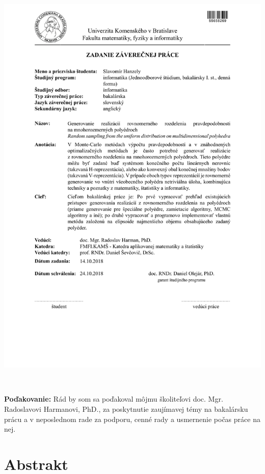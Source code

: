 \documentclass[12pt, twoside]{book}
\begin{document}
\newpage 
\thispagestyle{empty}
\hspace{-2cm}\includegraphics[width=1.1\textwidth]{images/zadanie}


\frontmatter

\setcounter{page}{3}
\newpage 
~

\vfill
{\bf Poďakovanie:} 
Rád by som sa poďakoval môjmu školiteľovi doc. Mgr. Radoslavovi Harmanovi, PhD., za poskytnutie zaujímavej témy na bakalársku prácu a v neposlednom rade za podporu, cenné rady a usmernenie počas práce na nej.


\newpage 
\section*{Abstrakt}
\end{document}
